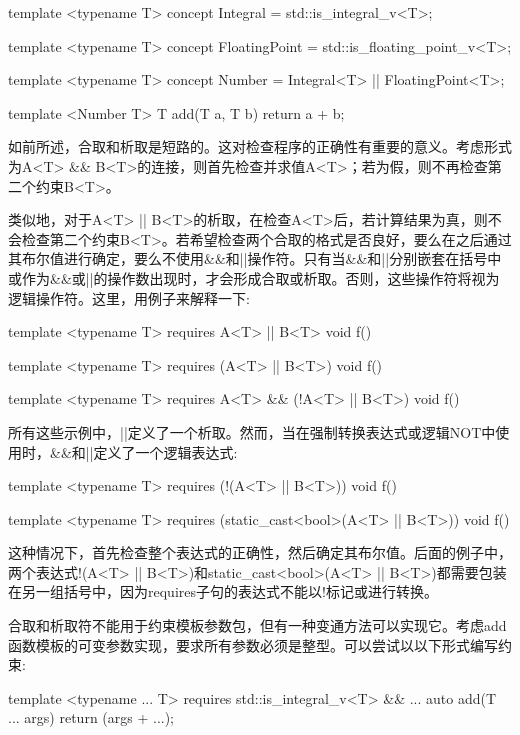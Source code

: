 \begin{cpp}
template <typename T>
concept Integral = std::is_integral_v<T>;

template <typename T>
concept FloatingPoint = std::is_floating_point_v<T>;

template <typename T>
concept Number = Integral<T> || FloatingPoint<T>;

template <Number T>
T add(T a, T b)
{
	return a + b;
}
\end{cpp}

如前所述，合取和析取是短路的。这对检查程序的正确性有重要的意义。考虑形式为A<T> \&\& B<T>的连接，则首先检查并求值A<T>；若为假，则不再检查第二个约束B<T>。

类似地，对于A<T> || B<T>的析取，在检查A<T>后，若计算结果为真，则不会检查第二个约束B<T>。若希望检查两个合取的格式是否良好，要么在之后通过其布尔值进行确定，要么不使用\&\&和||操作符。只有当\&\&和||分别嵌套在括号中或作为\&\&或||的操作数出现时，才会形成合取或析取。否则，这些操作符将视为逻辑操作符。这里，用例子来解释一下:

\begin{cpp}
template <typename T>
requires A<T> || B<T>
void f() {}

template <typename T>
requires (A<T> || B<T>)
void f() {}

template <typename T>
requires A<T> && (!A<T> || B<T>)
void f() {}
\end{cpp}

所有这些示例中，||定义了一个析取。然而，当在强制转换表达式或逻辑NOT中使用时，\&\&和||定义了一个逻辑表达式:

\begin{cpp}
template <typename T>
requires (!(A<T> || B<T>))
void f() {}

template <typename T>
requires (static_cast<bool>(A<T> || B<T>))
void f() {}
\end{cpp}

这种情况下，首先检查整个表达式的正确性，然后确定其布尔值。后面的例子中，两个表达式!(A<T> || B<T>)和static\_cast<bool>(A<T> || B<T>)都需要包装在另一组括号中，因为requires子句的表达式不能以!标记或进行转换。

合取和析取符不能用于约束模板参数包，但有一种变通方法可以实现它。考虑add函数模板的可变参数实现，要求所有参数必须是整型。可以尝试以以下形式编写约束:

\begin{cpp}
template <typename ... T>
requires std::is_integral_v<T> && ...
auto add(T ... args)
{
	return (args + ...);
}
\end{cpp}

